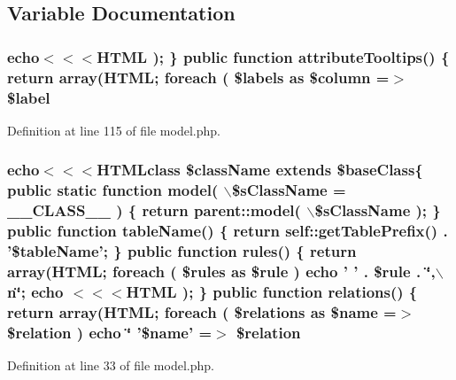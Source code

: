\subsection{Variable Documentation}
\hypertarget{templates_2model_2model_8php_a0bf7b9a135bed8ed3dcd4c376c25b88b}{
\subsubsection[{\$label}]{\setlength{\rightskip}{0pt plus 5cm}echo$<$$<$$<${\bf HTML} ); \} public function attributeTooltips() \{ return {\bf array}({\bf HTML}; {\bf foreach} ( \$labels as \$column =$>$ \$label}}
\label{templates_2model_2model_8php_a0bf7b9a135bed8ed3dcd4c376c25b88b}


Definition at line 115 of file model.php.

\hypertarget{templates_2model_2model_8php_a071d5a15ecc5f0db7b14df0dca0c6e47}{
\subsubsection[{\$relation}]{\setlength{\rightskip}{0pt plus 5cm}echo$<$$<$$<$HTMLclass \$className extends \$baseClass\{ public static function model( $\backslash$\$sClassName = \_\-\_\-CLASS\_\-\_\- ) \{ return parent::model( $\backslash$\$sClassName ); \} public function tableName() \{ return self::getTablePrefix() . '\$tableName'; \} public function rules() \{ return {\bf array}({\bf HTML}; {\bf foreach} ( \$rules as \$rule ) echo ' ' . \$rule . \char`\"{},$\backslash$n\char`\"{}; echo $<$$<$$<${\bf HTML} ); \} public function relations() \{ return {\bf array}({\bf HTML}; {\bf foreach} ( \$relations as \$name =$>$ \$relation ) echo \char`\"{} '\$name' =$>$ \$relation}}
\label{templates_2model_2model_8php_a071d5a15ecc5f0db7b14df0dca0c6e47}


Definition at line 33 of file model.php.

